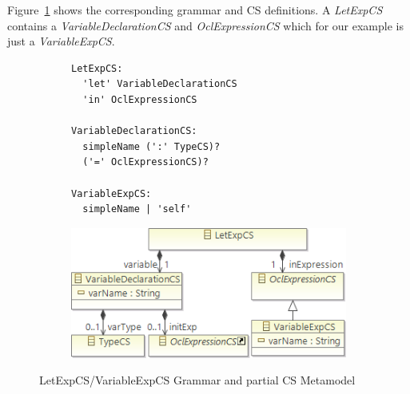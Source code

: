 \documentclass{llncs}
\begin{document}
Figure~\ref{fig:LetExpCS} shows the corresponding grammar and CS definitions. A \emph{LetExpCS} contains a \emph{VariableDeclarationCS} and \emph{OclExpressionCS} which for our example is just a \emph{VariableExpCS}. 
\begin{figure}[htbp]
\centering
\begin{subfigure}{0.45\textwidth}
  \centering
  \begin{lstlisting}[label=lst:letExpEBNF, language=Xtext]
LetExpCS:
  'let' VariableDeclarationCS 
  'in' OclExpressionCS
  	
VariableDeclarationCS:
  simpleName (':' TypeCS)?
  ('=' OclExpressionCS)?	

VariableExpCS:
  simpleName | 'self'
  \end{lstlisting} 
\end{subfigure}%
\begin{subfigure}{0.55\textwidth}
  \centering
  \includegraphics[scale=0.5]{images/LetExpCS.png}
\end{subfigure}
\caption{LetExpCS/VariableExpCS Grammar and partial CS Metamodel}
\label{fig:LetExpCS}
\end{figure}

\end{document}
